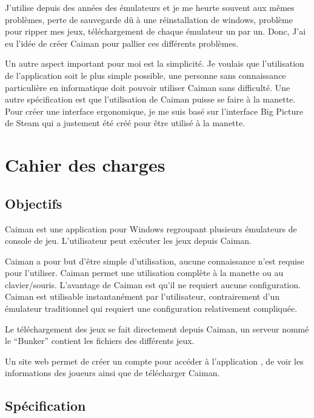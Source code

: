 \documentclass[a4paper,12pt,french]{sphinxmanual}
\begin{document}
\sphinxAtStartPar
J’utilise depuis des années des émulateurs et je me heurte souvent aux mêmes problèmes, perte de sauvegarde dû à une réinstallation de windows, problème pour ripper mes jeux, téléchargement de chaque émulateur un par un. Donc, J’ai eu l’idée de créer Caiman pour pallier ces différents problèmes.

\sphinxAtStartPar
Un autre aspect important pour moi est la simplicité. Je voulais que l’utilisation de l’application soit le plus simple possible, une personne sans connaissance particulière en informatique doit pouvoir utiliser Caiman sans difficulté. Une autre spécification est que l’utilisation de Caiman puisse se faire à la manette. Pour créer une interface ergonomique, je me suis basé sur l’interface Big Picture de Steam qui a justement été créé pour être utilisé  à la manette.


\chapter{Cahier des charges}
\label{\detokenize{cdc:cahier-des-charges}}\label{\detokenize{cdc::doc}}

\section{Objectifs}
\label{\detokenize{cdc:objectifs}}
\sphinxAtStartPar
Caiman est une application pour Windows regroupant plusieurs émulateurs de console de jeu. L’utilisateur peut exécuter les jeux depuis Caiman.

\sphinxAtStartPar
Caiman a pour but d’être simple d’utilisation, aucune connaissance n’est requise pour l’utiliser. Caiman permet une utilisation complète à la manette ou au clavier/souris. L’avantage de Caiman est qu’il ne requiert aucune configuration. Caiman est utilisable instantanément par l’utilisateur, contrairement  d’un émulateur traditionnel qui requiert une configuration relativement compliquée.

\sphinxAtStartPar
Le téléchargement des jeux se fait directement depuis Caiman, un serveur nommé le “Bunker” contient les fichiers des différents jeux.

\sphinxAtStartPar
Un site web permet de créer un compte pour accéder à l’application , de voir les informations des joueurs ainsi que de télécharger Caiman.


\section{Spécification}
\label{\detokenize{cdc:specification}}
\end{document}

